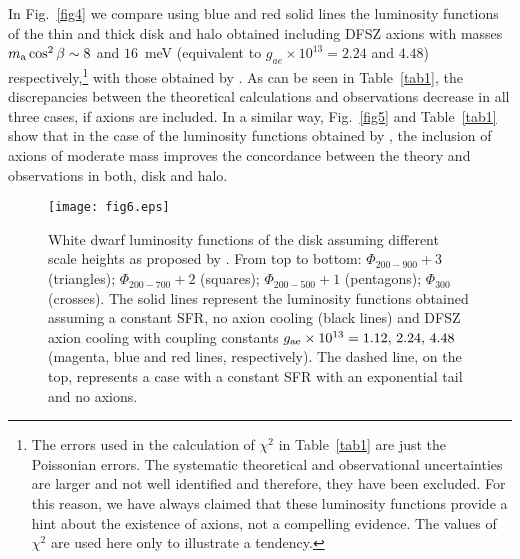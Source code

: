 \documentclass[useAMS,usenatbib]{mnras}
\begin{document}
 In Fig.~\ref{fig4}  we compare using  blue  and  red solid lines  the  luminosity functions 
of the thin and thick disk and halo obtained
including DFSZ axions with masses $m_{\rm  a} \cos^2 \beta \sim 8$ and
$16$~meV (equivalent to $g_{ae}\times 10^{13} =2.24$ and $4.48$)  
respectively,\footnote{The errors used in the calculation of $\chi^2$ in 
Table~\ref{tab1} are just the Poissonian errors. The systematic theoretical and observational 
uncertainties are larger and not well identified and therefore, they have been excluded. For this 
reason, we have always claimed that these luminosity functions provide a hint about the existence 
of axions, not a compelling evidence. The values of $\chi^2$ are used here only to illustrate 
a tendency.} with those obtained by \citet{rowe11}. As can be seen in Table~\ref{tab1}, the 
discrepancies  between  the  theoretical calculations and observations decrease in all three cases, 
if  axions  are  included.  In a similar way, Fig.~\ref{fig5} and Table~\ref{tab1} show that in the 
case of the luminosity functions obtained by \citet{munn17},
the inclusion of axions of moderate mass improves the concordance between the theory and observations in both, disk and halo.    

\begin{figure}
\centering
\texttt{[image: fig6.eps]}
\caption{White dwarf luminosity functions of the disk assuming different scale heights as proposed by \citet{kili17}. 
From top to bottom: $\Phi_{200-900}+3$ (triangles); $\Phi_{200-700}+2$ (squares);  $\Phi_{200-500}+1$ (pentagons);  
$\Phi_{300}$ (crosses). The  solid lines  represent the  luminosity  functions  obtained  assuming a constant SFR, 
no  axion cooling (black  lines) and DFSZ  axion cooling with coupling constants  
$g_{\rm ae} \times 10^{13} = 1.12, \, 2.24,\, 4.48 $  (magenta, blue and red lines,  respectively). 
The dashed line, on the top, represents a case with a constant SFR with an exponential tail and no axions. 
}
\label{fig6}
\end{figure}
\end{document}
